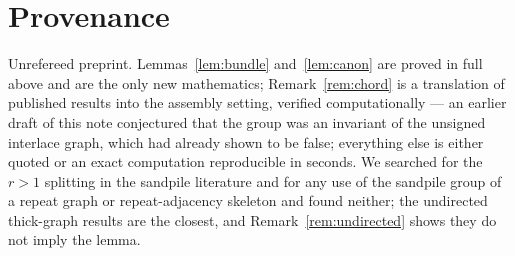 \documentclass[11pt]{article}
\theoremstyle{plain}
\theoremstyle{definition}
\theoremstyle{remark}
\begin{document}
\section*{Provenance}

Unrefereed preprint. Lemmas~\ref{lem:bundle} and~\ref{lem:canon} are proved in full
above and are the only new mathematics; Remark~\ref{rem:chord} is a translation of
published results \cite{ABS,MMN} into the assembly setting, verified computationally ---
an earlier draft of this note conjectured that the group was an invariant of the unsigned
interlace graph, which \cite[Rem.~6.7]{MMN} had already shown to be false; everything
else is either quoted or an exact computation reproducible in seconds. We searched for the $r>1$ splitting in the sandpile literature and for any use of
the sandpile group of a repeat graph or repeat-adjacency skeleton and found neither; the
undirected thick-graph results \cite{ChenSchedler,Alar} are the closest, and
Remark~\ref{rem:undirected} shows they do not imply the lemma.
\end{document}
